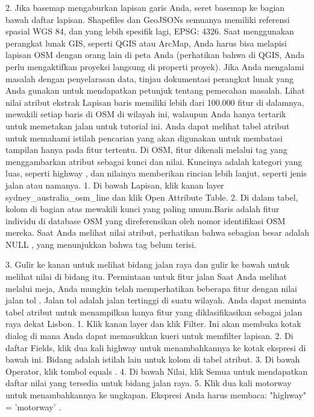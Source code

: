 2.	Jika basemap mengaburkan lapisan garis Anda, seret basemap ke bagian bawah daftar lapisan.
Shapefiles dan GeoJSONs semuanya memiliki referensi spasial WGS 84, dan yang lebih spesifik lagi, EPSG: 4326. Saat menggunakan perangkat lunak GIS, seperti QGIS atau ArcMap, Anda harus bisa melapisi lapisan OSM dengan orang lain di peta Anda (perhatikan bahwa di QGIS, Anda perlu mengaktifkan proyeksi langsung di properti proyek). Jika Anda mengalami masalah dengan penyelarasan data, tinjau dokumentasi perangkat lunak yang Anda gunakan untuk mendapatkan petunjuk tentang pemecahan masalah.
Lihat nilai atribut ekstrak
Lapisan baris memiliki lebih dari 100.000 fitur di dalamnya, mewakili setiap baris di OSM di wilayah ini, walaupun Anda hanya tertarik untuk memetakan jalan untuk tutorial ini. Anda dapat melihat tabel atribut untuk memahami istilah pencarian yang akan digunakan untuk membatasi tampilan hanya pada fitur tertentu.
Di OSM, fitur dikenali melalui tag yang menggambarkan atribut sebagai kunci dan nilai. Kuncinya adalah kategori yang luas, seperti highway , dan nilainya memberikan rincian lebih lanjut, seperti jenis jalan atau namanya.
1.	Di bawah Lapisan, klik kanan layer sydney_australia_osm_line dan klik Open Attribute Table.
2.	Di dalam tabel, kolom di bagian atas mewakili kunci yang paling umum.Baris adalah fitur individu di database OSM yang direferensikan oleh nomor identifikasi OSM mereka. Saat Anda melihat nilai atribut, perhatikan bahwa sebagian besar adalah NULL , yang menunjukkan bahwa tag belum terisi.
 
3.	Gulir ke kanan untuk melihat bidang jalan raya dan gulir ke bawah untuk melihat nilai di bidang itu.
Permintaan untuk fitur jalan
Saat Anda melihat melalui meja, Anda mungkin telah memperhatikan beberapa fitur dengan nilai jalan tol . Jalan tol adalah jalan tertinggi di suatu wilayah. Anda dapat meminta tabel atribut untuk menampilkan hanya fitur yang diklasifikasikan sebagai jalan raya dekat Lisbon.
1.	Klik kanan layer dan klik Filter. Ini akan membuka kotak dialog di mana Anda dapat memasukkan kueri untuk memfilter lapisan.
2.	Di daftar Fields, klik dua kali highway untuk menambahkannya ke kotak ekspresi di bawah ini. Bidang adalah istilah lain untuk kolom di tabel atribut.
3.	Di bawah Operator, klik tombol equals .
4.	Di bawah Nilai, klik Semua untuk mendapatkan daftar nilai yang tersedia untuk bidang jalan raya.
5.	Klik dua kali motorway untuk menambahkannya ke ungkapan. Ekspresi Anda harus membaca: "highway" = 'motorway' .
 
